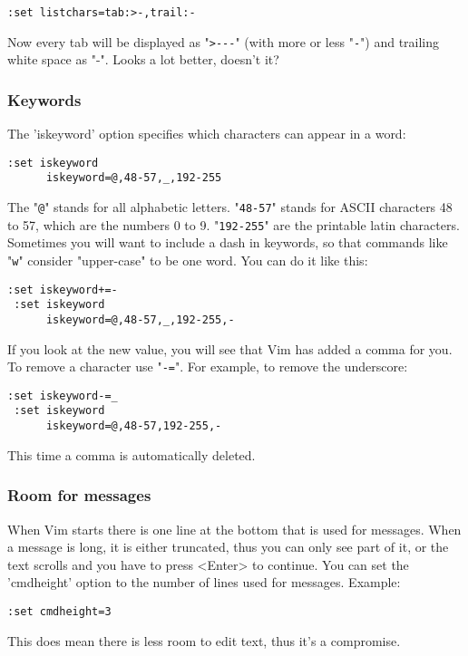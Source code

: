  \begin{Verbatim}[samepage=true]
 :set listchars=tab:>-,trail:-
 \end{Verbatim}

Now every tab will be displayed as "\verb!>---!" (with more or less "\verb!-!") and trailing white space as "-".
Looks a lot better, doesn't it?

\subsubsection{Keywords}
The 'iskeyword' option specifies which characters can appear in a word:

\begin{Verbatim}[samepage=true]
 :set iskeyword
      iskeyword=@,48-57,_,192-255 
\end{Verbatim}

The "\verb!@!" stands for all alphabetic letters.
"\verb!48-57!" stands for ASCII characters 48 to 57, which are the numbers 0 to 9.
"\verb!192-255!" are the printable latin characters.
Sometimes you will want to include a dash in keywords, so that commands like "\verb!w!" consider "upper-case" to be one word.
You can do it like this:

\begin{Verbatim}[samepage=true]
 :set iskeyword+=-
 :set iskeyword
      iskeyword=@,48-57,_,192-255,- 
\end{Verbatim}

If you look at the new value, you will see that Vim has added a comma for you.
To remove a character use "\verb!-=!".
For example, to remove the underscore:

\begin{Verbatim}[samepage=true]
 :set iskeyword-=_
 :set iskeyword
      iskeyword=@,48-57,192-255,- 
\end{Verbatim}

This time a comma is automatically deleted.

\subsubsection{Room for messages}
When Vim starts there is one line at the bottom that is used for messages.
When a message is long, it is either truncated, thus you can only see part of it, or the text scrolls and you have to press <Enter> to continue.
You can set the 'cmdheight' option to the number of lines used for messages.
Example:

 \begin{Verbatim}[samepage=true]
 :set cmdheight=3
 \end{Verbatim}

This does mean there is less room to edit text, thus it's a compromise.
\clearpage
